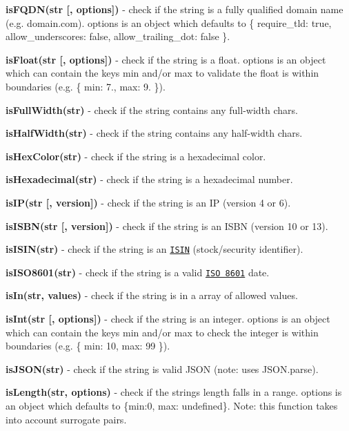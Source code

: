 \begin{DoxyItemize}
\item {\bfseries is\+F\+Q\+D\+N(str \mbox{[}, options\mbox{]})} -\/ check if the string is a fully qualified domain name (e.\+g. domain.\+com). {\ttfamily options} is an object which defaults to {\ttfamily \{ require\+\_\+tld\+: true, allow\+\_\+underscores\+: false, allow\+\_\+trailing\+\_\+dot\+: false \}}.
\item {\bfseries is\+Float(str \mbox{[}, options\mbox{]})} -\/ check if the string is a float. {\ttfamily options} is an object which can contain the keys {\ttfamily min} and/or {\ttfamily max} to validate the float is within boundaries (e.\+g. {\ttfamily \{ min\+: 7., max\+: 9. \}}).
\item {\bfseries is\+Full\+Width(str)} -\/ check if the string contains any full-\/width chars.
\item {\bfseries is\+Half\+Width(str)} -\/ check if the string contains any half-\/width chars.
\item {\bfseries is\+Hex\+Color(str)} -\/ check if the string is a hexadecimal color.
\item {\bfseries is\+Hexadecimal(str)} -\/ check if the string is a hexadecimal number.
\item {\bfseries is\+I\+P(str \mbox{[}, version\mbox{]})} -\/ check if the string is an IP (version 4 or 6).
\item {\bfseries is\+I\+S\+B\+N(str \mbox{[}, version\mbox{]})} -\/ check if the string is an I\+S\+BN (version 10 or 13).
\item {\bfseries is\+I\+S\+I\+N(str)} -\/ check if the string is an \href{https://en.wikipedia.org/wiki/International_Securities_Identification_Number}{\tt I\+S\+IN} (stock/security identifier).
\item {\bfseries is\+I\+S\+O8601(str)} -\/ check if the string is a valid \href{https://en.wikipedia.org/wiki/ISO_8601}{\tt I\+SO 8601} date.
\item {\bfseries is\+In(str, values)} -\/ check if the string is in a array of allowed values.
\item {\bfseries is\+Int(str \mbox{[}, options\mbox{]})} -\/ check if the string is an integer. {\ttfamily options} is an object which can contain the keys {\ttfamily min} and/or {\ttfamily max} to check the integer is within boundaries (e.\+g. {\ttfamily \{ min\+: 10, max\+: 99 \}}).
\item {\bfseries is\+J\+S\+O\+N(str)} -\/ check if the string is valid J\+S\+ON (note\+: uses J\+S\+O\+N.\+parse).
\item {\bfseries is\+Length(str, options)} -\/ check if the string\textquotesingle{}s length falls in a range. {\ttfamily options} is an object which defaults to {\ttfamily \{min\+:0, max\+: undefined\}}. Note\+: this function takes into account surrogate pairs.

\end{DoxyItemize}

